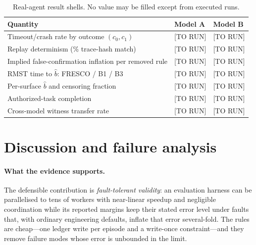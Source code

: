 \documentclass[11pt]{article}
\theoremstyle{definition}
\theoremstyle{remark}
\newcommand{\todo}[1]{\textcolor{red!70!black}{[#1]}}
\newcommand{\bhat}{\hat b}
\begin{document}
\begin{table}[t]\centering\small
\caption{Real-agent result shells. No value may be filled except from executed runs.}\label{tab:real}
\begin{tabular}{lll}
\toprule
Quantity & Model A & Model B \\\midrule
Timeout/crash rate by outcome $(c_0,c_1)$ & \todo{TO RUN} & \todo{TO RUN} \\
Replay determinism (\% trace-hash match) & \todo{TO RUN} & \todo{TO RUN} \\
Implied false-confirmation inflation per removed rule & \todo{TO RUN} & \todo{TO RUN} \\
RMST time to $\bhat$: FRESCO / B1 / B3 & \todo{TO RUN} & \todo{TO RUN} \\
Per-surface $\bhat$ and censoring fraction & \todo{TO RUN} & \todo{TO RUN} \\
Authorized-task completion & \todo{TO RUN} & \todo{TO RUN} \\
Cross-model witness transfer rate & \todo{TO RUN} & \todo{TO RUN} \\
\bottomrule\end{tabular}
\end{table}

\section{Discussion and failure analysis}\label{sec:discussion}

\paragraph{What the evidence supports.} The defensible contribution is \emph{fault-tolerant validity}: an evaluation harness can be parallelised to tens of workers with near-linear speedup and negligible coordination while its reported margins keep their stated error level under faults that, with ordinary engineering defaults, inflate that error several-fold. The rules are cheap---one ledger write per episode and a write-once constraint---and they remove failure modes whose error is unbounded in the limit.
\end{document}
